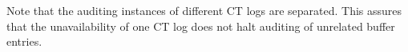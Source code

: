 Note that the auditing instances of different CT logs are separated.  This
assures that the unavailability of one CT log does not halt auditing of
unrelated buffer entries.


